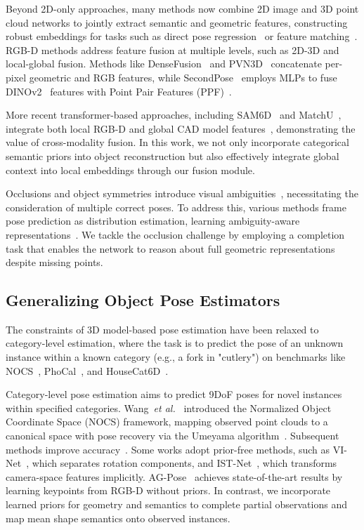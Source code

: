 Beyond 2D-only approaches, many methods now combine 2D image and 3D point cloud networks to jointly extract semantic and geometric features, constructing robust embeddings for tasks such as direct pose regression~\cite{wang2019densefusion,he2021ffb6d,chen2024secondpose,he2020pvn3d} or feature matching~\cite{huang2024matchu,caraffa2025freeze,lin2024sam}. RGB-D methods address feature fusion at multiple levels, such as 2D-3D and local-global fusion. Methods like DenseFusion~\cite{wang2019densefusion} and PVN3D~\cite{he2020pvn3d} concatenate per-pixel geometric and RGB features, while SecondPose~\cite{chen2024secondpose} employs MLPs to fuse DINOv2~\cite{oquab2023dinov2} features with Point Pair Features (PPF)~\cite{drostppf}.

More recent transformer-based approaches, including SAM6D~\cite{lin2024sam} and MatchU~\cite{huang2024matchu}, integrate both local RGB-D and global CAD model features~\cite{qin2023geotransformer,yu2023rotation,yu2024riga}, demonstrating the value of cross-modality fusion. In this work, we not only incorporate categorical semantic priors into object reconstruction but also effectively integrate global context into local embeddings through our fusion module.

Occlusions and object symmetries introduce visual ambiguities~\cite{manhardt2019explaining}, necessitating the consideration of multiple correct poses. To address this, various methods frame pose prediction as distribution estimation, learning ambiguity-aware representations~\cite{haugaard2023spyropose,vutukur2025alignist,stablepose}. We tackle the occlusion challenge by employing a completion task that enables the network to reason about full geometric representations despite missing points.

\subsection{Generalizing Object Pose Estimators} 
The constraints of 3D model-based pose estimation have been relaxed to category-level estimation, where the task is to predict the pose of an unknown instance within a known category (e.g., a fork in "cutlery") on benchmarks like NOCS~\cite{nocs}, PhoCal~\cite{wang2022phocal}, and HouseCat6D~\cite{jung2024housecat6d}. 

Category-level pose estimation aims to predict 9DoF poses for novel instances within specified categories. Wang~\textit{et al.}~\cite{nocs} introduced the Normalized Object Coordinate Space (NOCS) framework, mapping observed point clouds to a canonical space with pose recovery via the Umeyama algorithm~\cite{umeyama1991least}. Subsequent methods improve accuracy~\cite{chen2020learning,Chen_2021_CVPR,DualPoseNet,di2022gpv,Zheng_2023_CVPR,lin2024instance, zhang2024generative}. Some works adopt prior-free methods, such as VI-Net~\cite{lin2023vi}, which separates rotation components, and IST-Net~\cite{liu2023istnet}, which transforms camera-space features implicitly. AG-Pose~\cite{lin2024instance} achieves state-of-the-art results by learning keypoints from RGB-D without priors. In contrast, we incorporate learned priors for geometry and semantics to complete partial observations and map mean shape semantics onto observed instances.

